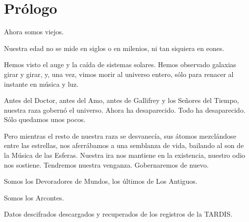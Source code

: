 \chapter*{Prólogo}

Ahora somos viejos.

Nuestra edad no se mide en siglos o en milenios, ni tan siquiera
en eones.

Hemos visto el auge y la caída de sistemas solares. Hemos observado
galaxias girar y girar, y, una vez, vimos morir al universo entero, sólo
para renacer al instante en música y luz.

Antes del Doctor, antes del Amo, antes de Gallifrey y los
Señores del Tiempo, nuestra raza gobernó el universo. Ahora ha
desaparecido. Todo ha desaparecido. Sólo quedamos unos pocos.

Pero mientras el resto de nuestra raza se desvanecía, sus átomos
mezclándose entre las estrellas, nos aferrábamos a una semblanza de
vida, bailando al son de la Música de las Esferas. Nuestra ira nos
mantiene en la existencia, nuestro odio nos sostiene. Tendremos nuestra
venganza. Gobernaremos de nuevo.

Somos los Devoradores de Mundos, los últimos de Los Antiguos.

Somos los Arcontes.

Datos descifrados descargados y recuperados de los registros de la
TARDIS.